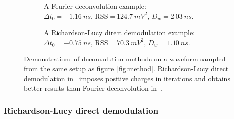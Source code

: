 \begin{figure}[H]
  \begin{subfigure}{0.5\textwidth}
    \centering
    \resizebox{\textwidth}{!}{}
    \caption{\label{fig:fd} A Fourier deconvolution example: \\ $\Delta t_0=\SI{-1.16}{ns}$, $\mathrm{RSS}=\SI{124.7}{mV^2}$, $D_w=\SI{2.03}{ns}$.}
  \end{subfigure}
  \begin{subfigure}{0.5\textwidth}
    \centering
    \resizebox{\textwidth}{!}{}
    \caption{\label{fig:lucy} A Richardson-Lucy direct demodulation example:\\ $\Delta t_0=\SI{-0.75}{ns}$, $\mathrm{RSS}=\SI{70.3}{mV^2}$, $D_w=\SI{1.10}{ns}$.}
  \end{subfigure}
  \caption{Demonstrations of deconvolution methods on a waveform sampled from the same setup as figure~\ref{fig:method}. Richardson-Lucy direct demodulation in~ imposes positive charges in iterations and obtains better results than Fourier deconvolution in~.}
\end{figure}

\subsubsection{Richardson-Lucy direct demodulation}
\label{sec:lucyddm}

